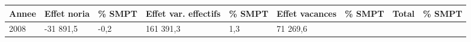 \begin{longtable}[]{@{}lllllllll@{}}
\toprule
\begin{minipage}[b]{0.05\columnwidth}\raggedright
Annee\strut
\end{minipage} & \begin{minipage}[b]{0.10\columnwidth}\raggedright
Effet noria\strut
\end{minipage} & \begin{minipage}[b]{0.06\columnwidth}\raggedright
\% SMPT\strut
\end{minipage} & \begin{minipage}[b]{0.17\columnwidth}\raggedright
Effet var. effectifs\strut
\end{minipage} & \begin{minipage}[b]{0.06\columnwidth}\raggedright
\% SMPT\strut
\end{minipage} & \begin{minipage}[b]{0.12\columnwidth}\raggedright
Effet vacances\strut
\end{minipage} & \begin{minipage}[b]{0.06\columnwidth}\raggedright
\% SMPT\strut
\end{minipage} & \begin{minipage}[b]{0.08\columnwidth}\raggedright
Total\strut
\end{minipage} & \begin{minipage}[b]{0.06\columnwidth}\raggedright
\% SMPT\strut
\end{minipage}\tabularnewline
\midrule
\endhead
\begin{minipage}[t]{0.05\columnwidth}\raggedright
2008\strut
\end{minipage} & \begin{minipage}[t]{0.10\columnwidth}\raggedright
-31 891,5\strut
\end{minipage} & \begin{minipage}[t]{0.06\columnwidth}\raggedright
-0,2\strut
\end{minipage} & \begin{minipage}[t]{0.17\columnwidth}\raggedright
161 391,3\strut
\end{minipage} & \begin{minipage}[t]{0.06\columnwidth}\raggedright
1,3\strut
\end{minipage} & \begin{minipage}[t]{0.12\columnwidth}\raggedright
71 269,6\strut
\end{minipage} & \begin{minipage}[t]{0.06\columnwidth}\raggedright

\end{minipage}
\end{longtable}
